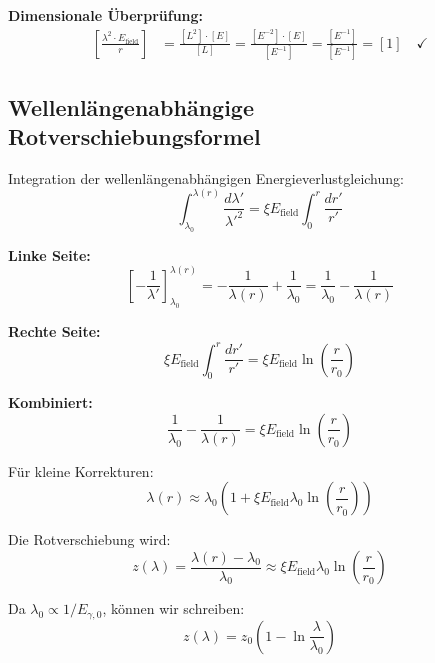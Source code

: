 \documentclass[12pt,a4paper]{report}
\begin{document}
	\textbf{Dimensionale Überprüfung:}
	\begin{align}
		\left[\frac{\lambda^2 \cdot E_{\text{field}}}{r}\right] &= \frac{[L^2] \cdot [E]}{[L]} = \frac{[E^{-2}] \cdot [E]}{[E^{-1}]} = \frac{[E^{-1}]}{[E^{-1}]} = [1] \quad \checkmark
	\end{align}
	
\subsection{Wellenlängenabhängige Rotverschiebungsformel}
\label{subsec:wavelength_dependent_redshift_formula}

Integration der wellenlängenabhängigen Energieverlustgleichung:
\begin{equation}
	\int_{\lambda_0}^{\lambda(r)} \frac{d\lambda'}{\lambda'^2} = \xi E_{\text{field}} \int_0^r \frac{dr'}{r'}
\end{equation}

\textbf{Linke Seite:}
\begin{equation}
	\left[-\frac{1}{\lambda'}\right]_{\lambda_0}^{\lambda(r)} = -\frac{1}{\lambda(r)} + \frac{1}{\lambda_0} = \frac{1}{\lambda_0} - \frac{1}{\lambda(r)}
\end{equation}

\textbf{Rechte Seite:}
\begin{equation}
	\xi E_{\text{field}} \int_0^r \frac{dr'}{r'} = \xi E_{\text{field}} \ln\left(\frac{r}{r_0}\right)
\end{equation}

\textbf{Kombiniert:}
\begin{equation}
	\frac{1}{\lambda_0} - \frac{1}{\lambda(r)} = \xi E_{\text{field}} \ln\left(\frac{r}{r_0}\right)
\end{equation}

Für kleine Korrekturen:
\begin{equation}
	\lambda(r) \approx \lambda_0 \left(1 + \xi E_{\text{field}} \lambda_0 \ln\left(\frac{r}{r_0}\right)\right)
\end{equation}

Die Rotverschiebung wird:
\begin{equation}
	z(\lambda) = \frac{\lambda(r) - \lambda_0}{\lambda_0} \approx \xi E_{\text{field}} \lambda_0 \ln\left(\frac{r}{r_0}\right)
\end{equation}

Da $\lambda_0 \propto 1/E_{\gamma,0}$, können wir schreiben:
\begin{equation}
	\boxed{z(\lambda) = z_0\left(1 - \ln\frac{\lambda}{\lambda_0}\right)}
	\label{eq:wavelength_dependent_redshift}
\end{equation}
\end{document}
